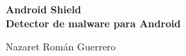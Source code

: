 \thispagestyle{empty}

\begin{center}
{\large\bfseries Android Shield \\ Detector de malware para Android }\\
\end{center}
\begin{center}
Nazaret Román Guerrero\\
\end{center}


\vspace{0.5cm}
\vspace{0.7cm}

